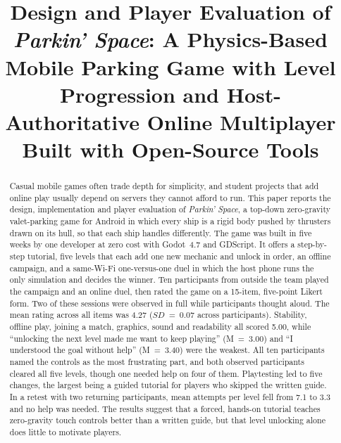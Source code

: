 \documentclass[conference]{IEEEtran}
\newcommand{\game}{\textit{Parkin' Space}}
\begin{document}
\title{Design and Player Evaluation of \game: A Physics-Based Mobile Parking Game with Level Progression and Host-Authoritative Online Multiplayer Built with Open-Source Tools}

\author{
}

\maketitle

\begin{abstract}
Casual mobile games often trade depth for simplicity, and student projects that add online play usually depend on servers they cannot afford to run. This paper reports the design, implementation and player evaluation of \game, a top-down zero-gravity valet-parking game for Android in which every ship is a rigid body pushed by thrusters drawn on its hull, so that each ship handles differently. The game was built in five weeks by one developer at zero cost with Godot~4.7 and GDScript. It offers a step-by-step tutorial, five levels that each add one new mechanic and unlock in order, an offline campaign, and a same-Wi-Fi one-versus-one duel in which the host phone runs the only simulation and decides the winner. Ten participants from outside the team played the campaign and an online duel, then rated the game on a 15-item, five-point Likert form. Two of these sessions were observed in full while participants thought aloud. The mean rating across all items was 4.27 ($SD$~=~0.07 across participants). Stability, offline play, joining a match, graphics, sound and readability all scored 5.00, while ``unlocking the next level made me want to keep playing'' (M~=~3.00) and ``I understood the goal without help'' (M~=~3.40) were the weakest. All ten participants named the controls as the most frustrating part, and both observed participants cleared all five levels, though one needed help on four of them. Playtesting led to five changes, the largest being a guided tutorial for players who skipped the written guide. In a retest with two returning participants, mean attempts per level fell from 7.1 to 3.3 and no help was needed. The results suggest that a forced, hands-on tutorial teaches zero-gravity touch controls better than a written guide, but that level unlocking alone does little to motivate players.
\end{abstract}
\end{document}
